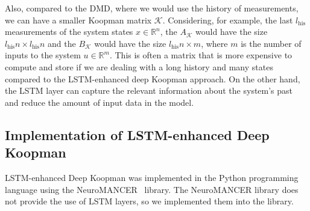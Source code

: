 \documentclass[conference]{IEEEtran}
\newcommand{\ui}[2]{#1_{\text{#2}}}  %
\begin{document}
Also, compared to the DMD, where we would use the history of measurements, we can have a smaller Koopman matrix \(\mathcal{K}\). Considering, for example, the last \(\ui{l}{his}\) measurements of the system states \(x \in \mathbb{R}^n\), the \(A_\mathcal{K}\) would have the size \(\ui{l}{his}n \times \ui{l}{his}n\) and the \(B_\mathcal{K}\) would have the size \(\ui{l}{his}n \times m\),  where \(m\) is the number of inputs to the system \(u \in \mathbb{R}^m\). This is often a matrix that is more expensive to compute and store if we are dealing with a long history and many states compared to the LSTM-enhanced deep Koopman approach. On the other hand, the LSTM layer can capture the relevant information about the system's past and reduce the amount of input data in the model.

\subsection{Implementation of LSTM-enhanced Deep Koopman}\label{subsec:methodology:lstm_koopman}
LSTM-enhanced Deep Koopman was implemented in the Python programming language using the NeuroMANCER~\cite{Neuromancer2023} library. 
The NeuroMANCER library does not provide the use of LSTM layers, so we implemented them into the library.

\end{document}

